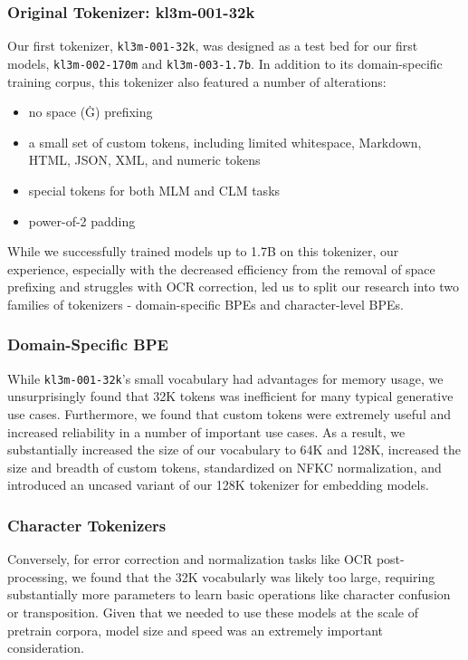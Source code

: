 \subsubsection{Original Tokenizer: kl3m-001-32k}

Our first tokenizer, \texttt{kl3m-001-32k}, was designed as a test bed for our first models, \texttt{kl3m-002-170m} and \texttt{kl3m-003-1.7b}.  In addition to its domain-specific training corpus, this tokenizer also featured a number of alterations:

\begin{itemize}
  \item no space (Ġ) prefixing
  \item a small set of custom tokens, including limited whitespace, Markdown, HTML, JSON, XML, and numeric tokens
  \item special tokens for both MLM and CLM tasks
  \item power-of-2 padding
\end{itemize}

While we successfully trained models up to 1.7B on this tokenizer, our experience, especially with the decreased efficiency from the removal of space prefixing and struggles with OCR correction, led us to split our research into two families of tokenizers - domain-specific BPEs and character-level BPEs.

\subsubsection{Domain-Specific BPE}
While \texttt{kl3m-001-32k}'s small vocabulary had advantages for memory usage, we unsurprisingly found that 32K tokens was inefficient for many typical generative use cases.  Furthermore, we found that custom tokens were extremely useful and increased reliability in a number of important use cases.  As a result, we substantially increased the size of our vocabulary to 64K and 128K, increased the size and breadth of custom tokens, standardized on NFKC normalization, and introduced an uncased variant of our 128K tokenizer for embedding models.

\subsubsection{Character Tokenizers}
Conversely, for error correction and normalization tasks like OCR post-processing, we found that the 32K vocabularly was likely too large, requiring substantially more parameters to learn basic operations like  character confusion or transposition.  Given that we needed to use these models at the scale of pretrain corpora, model size and speed was an extremely important consideration.

